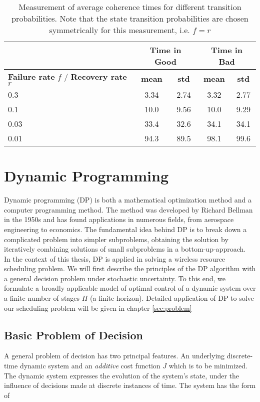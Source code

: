 \begin{table}[h]
  \begin{center}
  \begin{tabular}{|p{3.5cm}|c|c|c|c|}
  \hline 
  & \multicolumn{2}{|c|}{\textbf{Time in Good}} &
  \multicolumn{2}{|c|}{\textbf{Time in Bad}} \\
  \hline
  \textbf{Failure rate} $f$ / \textbf{Recovery rate} $r$ & \textbf{mean} & \textbf{std} & \textbf{mean}
  & \textbf{std}\\
  \hline \hline
  0.3 & 3.34 & 2.74 & 3.32 & 2.77 \\
  \hline 
  0.1 & 10.0 & 9.56 & 10.0 & 9.29 \\
  \hline 
  0.03 & 33.4 & 32.6 & 34.1 & 34.1 \\
  \hline 
  0.01 & 94.3 & 89.5 & 98.1 & 99.6 \\
  \hline 
  \end{tabular}
  \caption[Measurement of average coherence time]{Measurement of average
  coherence times for different transition probabilities. Note that the state
  transition probabilities are chosen symmetrically for this measurement, i.e.
  $f=r$}
  \label{tab:sojournTime}
  \end{center}
  \end{table}


\section{Dynamic Programming} \label{sec:DP}

Dynamic programming (DP) is both a mathematical optimization method and a
computer programming method. The method was developed by Richard Bellman in the
1950s and has found applications in numerous fields, from aerospace engineering
to economics. The fundamental idea behind DP is to break down a complicated
problem into simpler subproblems, obtaining the solution by iteratively
combining solutions of small subproblems in a bottom-up-approach. \\ In the
context of this thesis, DP is applied in solving a wireless resource scheduling
problem. We will first describe the principles of the DP algorithm with a
general decision problem under stochastic uncertainty. To this end, we formulate
a broadly applicable model of optimal control of a dynamic system over a finite
number of stages $H$ (a finite horizon). Detailed application of DP to solve our
scheduling problem will be given in chapter \ref{sec:problem}

\subsection*{Basic Problem of Decision}
A general problem of decision has two principal features. An underlying
discrete-time dynamic system and an \textit{additive} cost function $J$ which is
to be minimized. The dynamic system expresses the evolution of the system's
state, under the influence of decisions made at discrete instances of time. The
system has the form of

